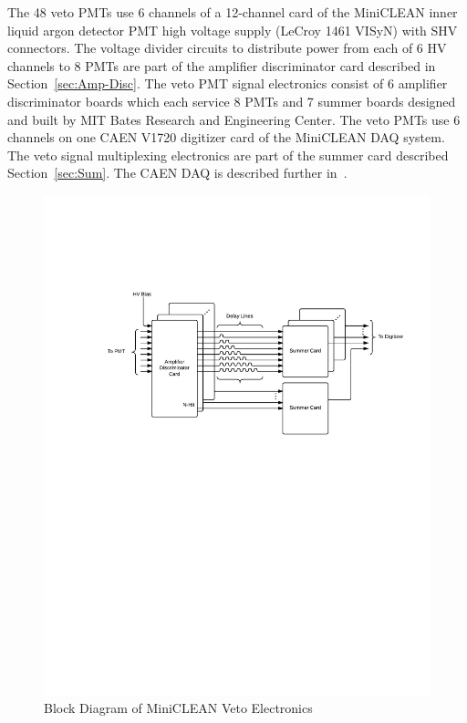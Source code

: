 \documentclass[review,number,sort&compress]{elsarticle}
\begin{document}
The 48 veto PMTs use 6 channels of a 12-channel card of the
MiniCLEAN inner liquid argon detector PMT high voltage supply (LeCroy 1461 VISyN)
with SHV connectors. The voltage divider circuits to distribute power
from each of 6 HV channels to 8 PMTs are part of the amplifier
discriminator card described in Section~\ref{sec:Amp-Disc}. The veto
PMT signal electronics consist of 6 amplifier discriminator boards which each service
8 PMTs and 7 summer boards designed and built by MIT Bates Research and Engineering Center.
The veto PMTs use 6 channels on one CAEN V1720 digitizer
card of the MiniCLEAN DAQ system. The veto signal multiplexing
electronics are part of the summer card described
Section~\ref{sec:Sum}. The CAEN DAQ is described further
in~\cite{ref:gastler_thesis}.

\begin{figure}[ht]
\begin{center}
\includegraphics[width=5in, keepaspectratio=true, trim=1.25in 5.75in 0.5in 2in, clip=true]{graphics/block.pdf}
\caption{Block Diagram of MiniCLEAN Veto Electronics
\label{fig:block_diagram}}
\end{center}
\end{figure}
\end{document}
